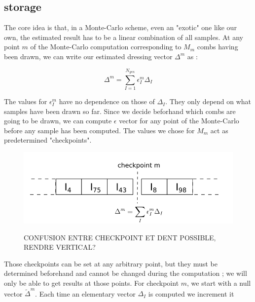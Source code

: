 \documentclass[./thesis.tex]{subfiles}
\begin{document}
\subsection{storage}

The core idea is that, in a Monte-Carlo scheme, even an "exotic" one like our own, the estimated result has to be a linear combination of all samples. At any point $m$ of the Monte-Carlo computation corresponding to $M_m$ combs having been drawn, we can write our estimated dressing vector $\Delta^m$ as :


\begin{equation}
\Delta^m = \sum_{I=1}^{N_{gen}} \epsilon^m_{I} \Delta_I
\end{equation}


The values for $\epsilon^m_I$ have no dependence on those of $\Delta_I$. They only depend on what samples have been drawn so far. Since we decide beforhand which combs are going to be drawn, we can compute $\epsilon$ vector for any point of the Monte-Carlo before any sample has been computed. The values we chose for $M_m$ act as predetermined "checkpoints".


\begin{figure}[h!]
	\begin{center}
		\includegraphics[width=1.00\columnwidth]{figures/matrix_dressing/checkpoint}
		\caption{\label{checkpoint}}
		CONFUSION ENTRE CHECKPOINT ET DENT POSSIBLE, RENDRE VERTICAL?
	\end{center}
\end{figure}



Those checkpoints can be set at any arbitrary point, but they must be determined beforehand and cannot be changed during the computation ; we will only be able to get results at those points.
For checkpoint $m$, we start with a null vector $\tilde \Delta^m$. Each time an elementary vector $\Delta_I$ is computed
we increment it 
\end{document}
